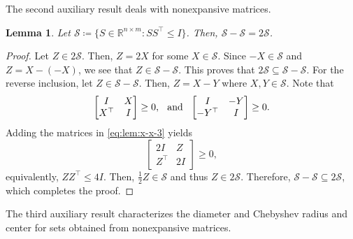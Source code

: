 \documentclass[pdflatex,sn-mathphys-num]{sn-jnl}%
\theoremstyle{thmstyleone}
\newtheorem{lemma}[theorem]{Lemma}
\begin{document}
The second auxiliary result deals with nonexpansive matrices.

\begin{lemma}
\label{lem:x-x}
Let $\mathcal{S}\coloneqq \{S\in\mathbb{R}^{n\times m}:SS^\top\leq I\}$. Then, $\mathcal{S}-\mathcal{S}=2\mathcal{S}$.
\end{lemma}
\begin{proof}
Let $Z\in2\mathcal{S}$. Then, $Z=2X$ for some $X\in\mathcal{S}$. Since $-X\in\mathcal{S}$ and $Z=X-(-X)$, we see that $Z\in\mathcal{S}-\mathcal{S}$. This proves that $2\mathcal{S}\subseteq \mathcal{S}-\mathcal{S}$. For the reverse inclusion, let $Z\in\mathcal{S}-\mathcal{S}$. Then, $Z=X-Y$ where $X,Y\in\mathcal{S}$. Note that
\begin{equation}
\label{eq:lem:x-x-3}
\begin{bmatrix}
I & X \\ X^\top & I
\end{bmatrix}\geq 0,\hspace{0.25 cm}\text{and}\hspace{0.25 cm} \begin{bmatrix}
I & -Y \\ -Y^\top & I
\end{bmatrix}\geq 0.
\end{equation}
Adding the matrices in \eqref{eq:lem:x-x-3} yields
\begin{equation}
\begin{bmatrix}
2I & Z \\ Z^\top & 2I
\end{bmatrix}\geq 0,
\end{equation}
equivalently, $ZZ^\top\leq 4I$. Then, $\tfrac{1}{2}Z\in\mathcal{S}$ and thus $Z\in2\mathcal{S}$. Therefore, $\mathcal{S}-\mathcal{S}\subseteq 2\mathcal{S}$, which completes the proof. 
\end{proof}

The third auxiliary result characterizes the diameter and Chebyshev radius and center for sets obtained from nonexpansive matrices. 
\end{document}
